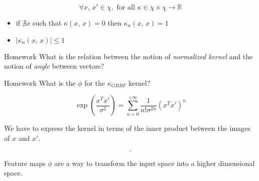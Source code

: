 \begin{note}
	\begin{equation*}
		\forall x,\,x' \in \chi, \text{ for all } \kappa
		\in \chi \times \chi \to \mathds R
	\end{equation*}
	\begin{itemize}
		\item if $\nexists x$ such that $\kappa(x,\,x) = 0$ then
		      $\kappa_n(x,\,x) = 1$
		\item $\left| \kappa_n(x,\,x) \right| \leq 1$
	\end{itemize}
\end{note}

\begin{exercise}{Homework}{}
	What is the relation between the notion of \emph{normalized kernel}
	and the notion of \emph{angle} between vectors?
\end{exercise}

\begin{exercise}{Homework}{}
	What is the $\phi$ for the $\kappa_{GRBF}$ kernel?

	\begin{hint}
		\begin{equation*}
			\exp\left(
			\frac{x^Tx'}{\sigma^2}
			\right) = \sum_{n=0}^{+\infty} \frac{1}{n!\sigma^{2n}} (x^Tx')^n
		\end{equation*}

		We have to express the kernel in terms of the inner product
		between the images of $x$ and $x'$.
	\end{hint}

	\tcblower

	\begin{equation*}
		.
	\end{equation*}
\end{exercise}

\begin{note}
	Feature maps $\phi$ are a way to transform the input space into a
	higher dimensional space.
\end{note}
